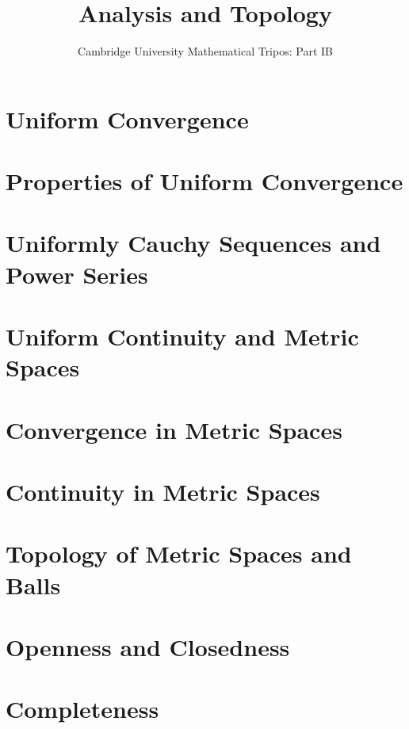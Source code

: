 \documentclass{article}
\title{Analysis and Topology}
\author{Cambridge University Mathematical Tripos: Part IB}
\begin{document}
\maketitle

\tableofcontentsnewpage{}

\section{Uniform Convergence}

\section{Properties of Uniform Convergence}

\section{Uniformly Cauchy Sequences and Power Series}

\section{Uniform Continuity and Metric Spaces}

\section{Convergence in Metric Spaces}

\section{Continuity in Metric Spaces}

\section{Topology of Metric Spaces and Balls}

\section{Openness and Closedness}

\section{Completeness}

\end{document}
